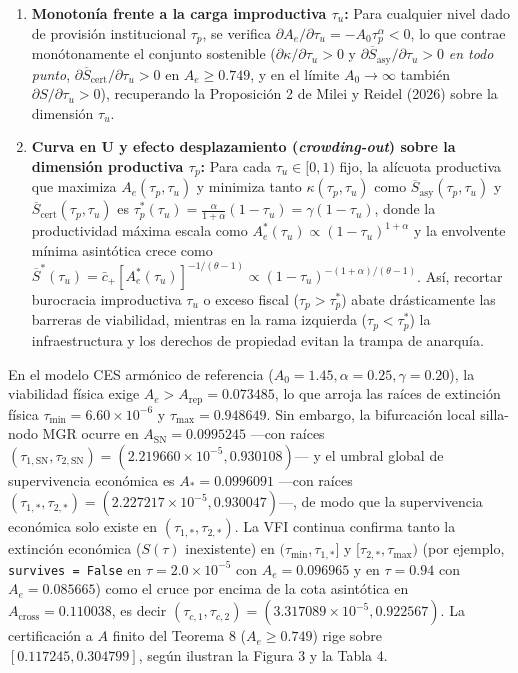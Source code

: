 \documentclass[11pt,letterpaper]{article}
\theoremstyle{plain}
\begin{document}
\begin{enumerate}
\item \textbf{Monotonía frente a la carga improductiva $\tau_u$:} Para cualquier nivel dado de provisión institucional $\tau_p$, se verifica $\partial A_e/\partial\tau_u = -A_0\tau_p^\alpha < 0$, lo que contrae monótonamente el conjunto sostenible ($\partial\kappa/\partial\tau_u>0$ y $\partial\overline{S}_{\mathrm{asy}}/\partial\tau_u>0$ \emph{en todo punto}, $\partial\overline{S}_{\mathrm{cert}}/\partial\tau_u>0$ en $A_e\ge 0.749$, y en el límite $A_0\to\infty$ también $\partial S/\partial\tau_u>0$), recuperando la Proposición 2 de Milei y Reidel (2026) sobre la dimensión $\tau_u$.
\item \textbf{Curva en U y efecto desplazamiento (\emph{crowding-out}) sobre la dimensión productiva $\tau_p$:} Para cada $\tau_u\in[0,1)$ fijo, la alícuota productiva que maximiza $A_e(\tau_p,\tau_u)$ y minimiza tanto $\kappa(\tau_p,\tau_u)$ como $\overline{S}_{\mathrm{asy}}(\tau_p,\tau_u)$ y $\overline{S}_{\mathrm{cert}}(\tau_p,\tau_u)$ es $\tau_p^*(\tau_u)=\frac{\alpha}{1+\alpha}(1-\tau_u)=\gamma(1-\tau_u)$, donde la productividad máxima escala como $A_e^*(\tau_u)\propto (1-\tau_u)^{1+\alpha}$ y la envolvente mínima asintótica crece como $\overline{S}^*(\tau_u)=\bar{c}_+[A_e^*(\tau_u)]^{-1/(\theta-1)}\propto (1-\tau_u)^{-(1+\alpha)/(\theta-1)}$. Así, recortar burocracia improductiva $\tau_u$ o exceso fiscal ($\tau_p>\tau_p^*$) abate drásticamente las barreras de viabilidad, mientras en la rama izquierda ($\tau_p<\tau_p^*$) la infraestructura y los derechos de propiedad evitan la trampa de anarquía.
\end{enumerate}

En el modelo CES armónico de referencia ($A_0=1.45, \alpha=0.25, \gamma=0.20$), la viabilidad física exige $A_e > A_{\mathrm{rep}} = 0.073485$, lo que arroja las raíces de extinción física $\tau_{\min}=6.60\times 10^{-6}$ y $\tau_{\max}=0.948649$. Sin embargo, la bifurcación local silla-nodo MGR ocurre en $A_{\mathrm{SN}}=0.0995245$ ---con raíces $(\tau_{1,\mathrm{SN}},\tau_{2,\mathrm{SN}})=(2.219660\times 10^{-5}, 0.930108)$--- y el umbral global de supervivencia económica es $A_*=0.0996091$ ---con raíces $(\tau_{1,*},\tau_{2,*})=(2.227217\times 10^{-5}, 0.930047)$---, de modo que la supervivencia económica solo existe en $(\tau_{1,*},\tau_{2,*})$. La VFI continua confirma tanto la extinción económica ($S(\tau)$ inexistente) en $(\tau_{\min},\tau_{1,*}]$ y $[\tau_{2,*},\tau_{\max})$ (por ejemplo, \texttt{survives = False} en $\tau=2.0\times 10^{-5}$ con $A_e=0.096965$ y en $\tau=0.94$ con $A_e=0.085665$) como el cruce por encima de la cota asintótica en $A_{\mathrm{cross}}=0.110038$, es decir $(\tau_{c,1},\tau_{c,2})=(3.317089\times 10^{-5}, 0.922567)$. La certificación a $A$ finito del Teorema 8 ($A_e\ge 0.749$) rige sobre $[0.117245, 0.304799]$, según ilustran la Figura 3 y la Tabla 4.
\end{document}
